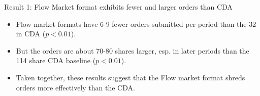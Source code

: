 \documentclass[10pt]{beamer}
\begin{document}
\begin{frame}{Result 1: Flow Market format exhibits fewer and larger orders than CDA}
\begin{itemize}
\item Flow market formats have 6-9 fewer orders submitted per period than the 32 in CDA ($p < 0.01$).
\item But the orders are about 70-80 shares larger, esp. in later periods than the 114 share CDA baseline ($p < 0.01$). 
\item Taken together, these results suggest that the Flow market format shreds orders more effectively than the CDA. 
\end{itemize}   
\end{frame}



\end{document}

